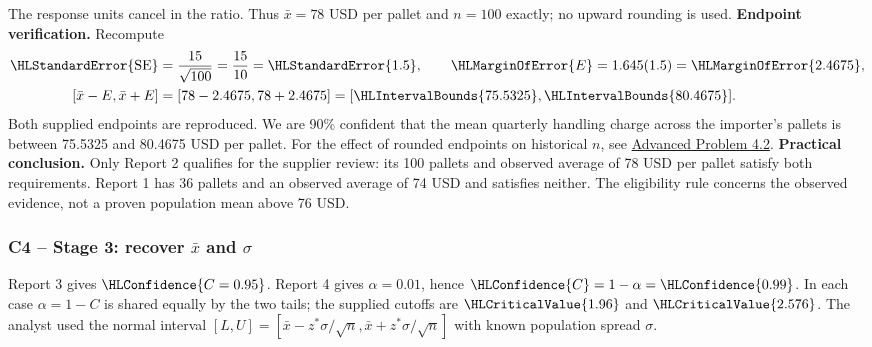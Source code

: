 The response units cancel in the ratio. Thus $\bar x=78$ USD per pallet and $n=100$ exactly; no upward rounding is used.
\textbf{Endpoint verification.} Recompute
\[\begin{aligned}
\HLStandardError{\mathrm{SE}}&=\frac{15}{\sqrt{100}}=\frac{15}{10}=\HLStandardError{1.5},\qquad \HLMarginOfError{E}=1.645(1.5)=\HLMarginOfError{2.4675},\\
[\bar x-E,\bar x+E]&=[78-2.4675,78+2.4675]=[\HLIntervalBounds{75.5325},\HLIntervalBounds{80.4675}].
\end{aligned}\]
Both supplied endpoints are reproduced. We are 90\% confident that the mean quarterly handling charge across the importer's pallets is between 75.5325 and 80.4675 USD per pallet.
For the effect of rounded endpoints on historical $n$, see \hyperref[prob:c4-advanced-2]{Advanced Problem 4.2}.
\textbf{Practical conclusion.} Only Report 2 qualifies for the supplier review: its 100 pallets and observed average of 78 USD per pallet satisfy both requirements. Report 1 has 36 pallets and an observed average of 74 USD and satisfies neither. The eligibility rule concerns the observed evidence, not a proven population mean above 76 USD.
\clearpage
\subsubsection*{C4 -- Stage 3: recover $\bar x$ and $\sigma$}\label{sol:c4-2-c}
\begingroup
\setlength{\abovedisplayskip}{6pt}
\setlength{\belowdisplayskip}{6pt}
\setlength{\abovedisplayshortskip}{3pt}
\setlength{\belowdisplayshortskip}{4pt}
\setlength{\parskip}{4pt}

Report 3 gives $\HLConfidence{C=0.95}$. Report 4 gives $\alpha=0.01$, hence $\HLConfidence{C}=1-\alpha=\HLConfidence{0.99}$. In each case $\alpha=1-C$ is shared equally by the two tails; the supplied cutoffs are $\HLCriticalValue{1.96}$ and $\HLCriticalValue{2.576}$. The analyst used the normal interval $[L,U]=[\bar x-z^*\sigma/\sqrt n,\bar x+z^*\sigma/\sqrt n]$ with known population spread $\sigma$.

